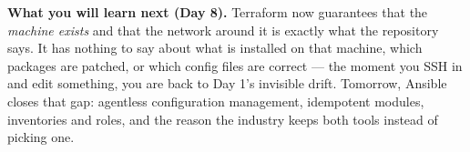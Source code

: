 \begin{keyidea}
\textbf{What you will learn next (Day 8).} Terraform now guarantees that the \emph{machine exists} and that the network around it is exactly what the repository says. It has nothing to say about what is installed on that machine, which packages are patched, or which config files are correct --- the moment you SSH in and edit something, you are back to Day 1's invisible drift. Tomorrow, Ansible closes that gap: agentless configuration management, idempotent modules, inventories and roles, and the reason the industry keeps both tools instead of picking one.
\end{keyidea}
